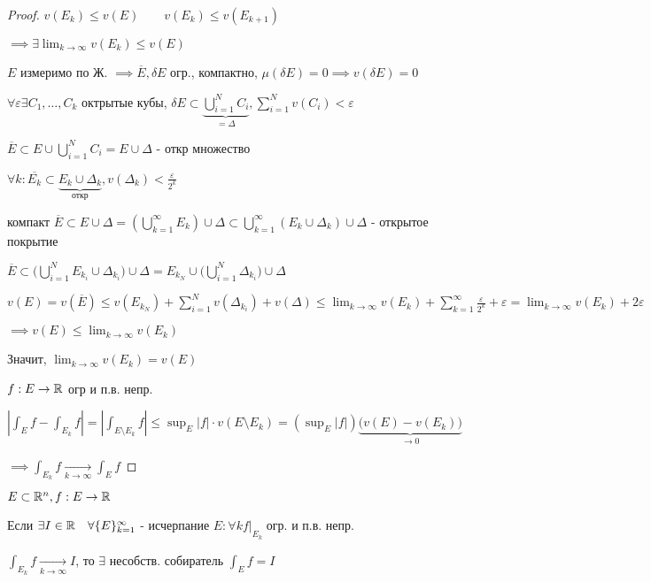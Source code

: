     \begin{proof}
        $v(E_k) \le v(E)\qquad v(E_k) \le v(E_{k+1})$

        $\implies \exists \lim_{k\to\infty} v(E_k) \le v(E)$

        $E$ измеримо по Ж. $\implies \overline{E}, \delta E$ огр., компактно, 
        $\mu(\delta E) = 0 \implies v(\delta E) = 0$

        $\forall \varepsilon \exists C_1, \dotsc, C_k$  октрытые кубы, 
        $\delta E \subset \underbrace{\bigcup^N_{i=1}C_i}_{=\Delta}, \sum^N_{i=1}v(C_i) < \varepsilon$

        $\overline{E} \subset E \cup \bigcup^N_{i=1}C_i = E \cup \Delta$ - откр множество

        $\forall k: \overline{E_k} \subset \underbrace{E_k \cup \Delta_k}_{\text{откр}},  v(\Delta_k) < \frac{\varepsilon}{2^k}$

        компакт $\overline{E} \subset E \cup \Delta = (\bigcup^\infty_{k=1}E_k)\cup \Delta \subset \bigcup^\infty_{k=1}(E_k \cup \Delta_k)\cup \Delta$ - открытое покрытие

        $\overline{E} \subset \big(\bigcup^N_{i=1}E_{k_i}\cup \Delta_{k_i}\big) \cup \Delta = 
        E_{k_N}\cup \big(\bigcup^N_{i=1}\Delta_{k_i}\big)\cup \Delta$

        $\displaystyle v(E) = v(\overline{E}) \le v(E_{k_N}) + \sum^N_{i=1}v(\Delta_{k_i}) + v(\Delta) \le
        \lim_{k\to\infty} v(E_k) + \sum^\infty_{k=1}\frac{\varepsilon}{2^k} + \varepsilon = 
        \lim_{k\to\infty} v(E_k) + 2\varepsilon$

        $\implies v(E) \le \lim_{k \to \infty} v(E_k)$

        Значит, $\lim_{k\to\infty}v(E_k) = v(E)$

        $f: E \to \mathbb{R}$ огр и п.в. непр.

        $| \int_E f - \int_{E_k} f | = | \int_{E\setminus E_k} f | \le 
        \sup_E |f| \cdot v(E\setminus E_k) = (\sup_E |f |) \underbrace{\big(v(E) - v(E_k)\big)}_{\to 0}$

        $\implies \int_{E_k} f \underset{k\to\infty}{\to} \int_E f$
    \end{proof}

    \begin{definition}
        $E \subset \mathbb{R}^n, f: E \to \mathbb{R}$

        Если $\exists I \in \mathbb{R} \quad \forall \{ E \}^\infty_{k=1}$ - исчерпание $E: \forall k f|\underset{E_k}{ }$ огр. и п.в. непр.

        $\int_{E_k} f \underset{k\to\infty}{\to} I$, то $\exists$ несобств. собиратель $\int_E f = I$
    \end{definition}

